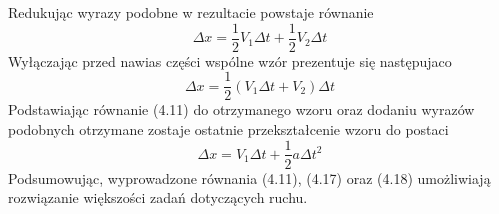 Redukując wyrazy podobne w rezultacie powstaje równanie
\begin{equation}\Delta x =\frac{1}{2}V_1\Delta t + \frac{1}{2}V_2\Delta t\end{equation}
Wyłączając przed nawias części wspólne wzór prezentuje się następujaco
\begin{equation}\Delta x = \frac{1}{2}(V_1\Delta t + V_2)\Delta t\end{equation}
Podstawiając równanie (4.11) do otrzymanego wzoru oraz dodaniu wyrazów podobnych otrzymane zostaje ostatnie przekształcenie wzoru do postaci
\begin{equation}\Delta x =V_1\Delta t+\frac{1}{2}a\Delta t^2\end{equation}
Podsumowując, wyprowadzone równania (4.11), (4.17) oraz (4.18) umożliwiają rozwiązanie większości zadań dotyczących ruchu.
